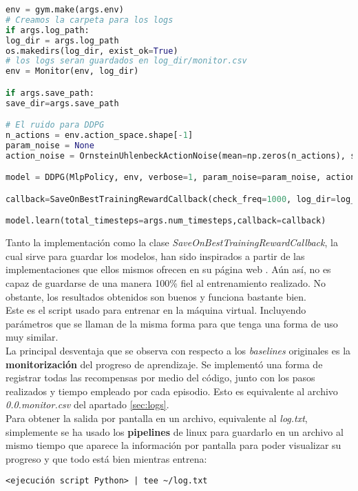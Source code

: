 \documentclass[11pt,fleqn]{book} %
\begin{document}
\begin{lstlisting}[language=python]
env = gym.make(args.env)
# Creamos la carpeta para los logs
if args.log_path:
log_dir = args.log_path
os.makedirs(log_dir, exist_ok=True)
# los logs seran guardados en log_dir/monitor.csv
env = Monitor(env, log_dir)

if args.save_path:
save_dir=args.save_path

# El ruido para DDPG
n_actions = env.action_space.shape[-1]
param_noise = None
action_noise = OrnsteinUhlenbeckActionNoise(mean=np.zeros(n_actions), sigma=float(0.5) * np.ones(n_actions))

model = DDPG(MlpPolicy, env, verbose=1, param_noise=param_noise, action_noise=action_noise,seed=args.seed)

callback=SaveOnBestTrainingRewardCallback(check_freq=1000, log_dir=log_dir, save_dir=save_dir)

model.learn(total_timesteps=args.num_timesteps,callback=callback)
\end{lstlisting}


Tanto la implementación como la clase \textit{SaveOnBestTrainingRewardCallback}, la cual sirve para guardar los modelos, han sido inspirados a partir de las implementaciones que ellos mismos ofrecen en su página web \cite{article:codigoDDPG} \cite{article:stableDDPG}. Aún así, no es capaz de guardarse de una manera 100\% fiel al entrenamiento realizado. No obstante, los resultados obtenidos son buenos y funciona bastante bien. \\

Este es el script usado para entrenar en la máquina virtual. Incluyendo parámetros que se llaman de la misma forma para que tenga una forma de uso muy similar. \\

La principal desventaja que se observa con respecto a los \textit{baselines} originales es la \textbf{monitorización} del progreso de aprendizaje. Se implementó una forma de registrar todas las recompensas por medio del código, junto con los pasos realizados y tiempo empleado por cada episodio. Esto es equivalente al archivo \textit{0.0.monitor.csv} del apartado \ref{sec:logs}. \\

Para obtener la salida por pantalla en un archivo, equivalente al \textit{log.txt}, simplemente se ha usado los \textbf{pipelines} de linux para guardarlo en un archivo al mismo tiempo que aparece la información por pantalla para poder visualizar su progreso y que todo está bien mientras entrena:

\begin{verbatim}
<ejecución script Python> | tee ~/log.txt
\end{verbatim} 
\end{document}
